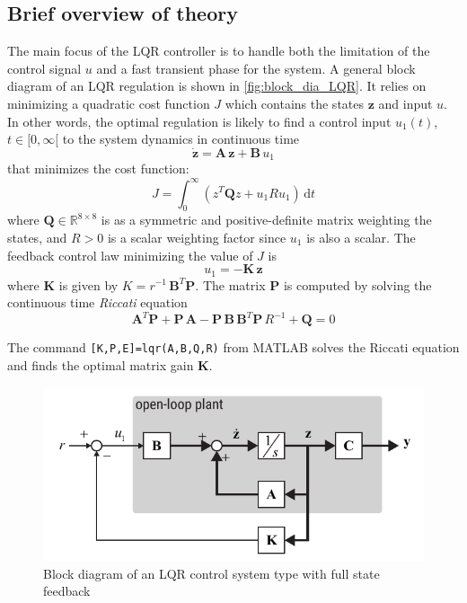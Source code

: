 \documentclass[a4paper,12pt]{article}
\begin{document}
\subsection{Brief overview of theory}
The main focus of the LQR controller is to handle both the limitation of the control signal $u$ and a fast transient phase for the system. A general block diagram of an LQR regulation is shown in \autoref{fig:block_dia_LQR}. It relies on minimizing a quadratic cost function $J$ which contains the states $\mathbf{z}$ and input $u$. In other words, the optimal regulation is likely to find a control input $u_1(t)$, $t\in[0,\infty[$ to the system dynamics in continuous time
\[\dot{\mathbf{z}}=\mathbf{A}\,\mathbf{z}+\mathbf{B}\,u_1\]
that minimizes the cost function:
\[
J = \int^\infty_0 \left( z^T\mathbf{Q}z + u_1 R u_1 \right)\, \text{d}t
\]
where $\mathbf{Q}\in \mathbb{R}^{8\times8}$ is as a symmetric and positive-definite matrix weighting the states, and $R>0$ is a scalar weighting factor since $u_1$ is also a scalar. The feedback control law minimizing the value of $J$ is
\[u_1 = -\mathbf{K}\,\mathbf{z}\]
where $\mathbf{K}$ is given by $K=r^{-1}\,\mathbf{B}^T\mathbf{P}$. The matrix $\mathbf{P}$ is computed by solving the continuous time \emph{Riccati} equation
\[
\mathbf{A}^T\mathbf{P} + \mathbf{P\,A} - \mathbf{P\,B\,B}^T \mathbf{P}\,R^{-1} + \mathbf{Q} = 0
\]

The command \texttt{[K,P,E]=lqr(A,B,Q,R)} from MATLAB solves the Riccati equation and finds the optimal matrix gain $\mathbf{K}$.
\begin{figure}[ht]
	\centering
	\includegraphics[width=13cm]{illustrations/block_dia_LQR.pdf}
	\caption{Block diagram of an LQR control system type with full state feedback}
	\label{fig:block_dia_LQR}
\end{figure}
\end{document}
